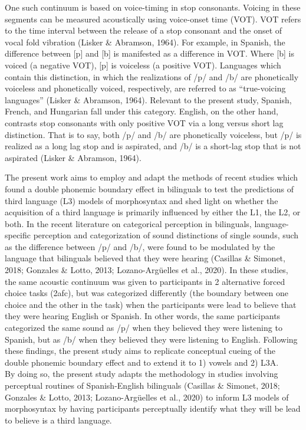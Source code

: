 \documentclass[
  english,
  man]{apa6}
\begin{document}
One such continuum is based on voice-timing in stop consonants.
Voicing in these segments can be measured acoustically using voice-onset time (VOT).
VOT refers to the time interval between the release of a stop consonant and the onset of vocal fold vibration (Lisker \& Abramson, 1964).
For example, in Spanish, the difference between {[}p{]} and {[}b{]} is manifested as a difference in VOT.
Where {[}b{]} is voiced (a negative VOT), {[}p{]} is voiceless (a positive VOT).
Languages which contain this distinction, in which the realizations of /p/ and /b/ are phonetically voiceless and phonetically voiced, respectively, are referred to as ``true-voicing languages'' (Lisker \& Abramson, 1964).
Relevant to the present study, Spanish, French, and Hungarian fall under this category.
English, on the other hand, contrasts stop consonants with only positive VOT via a long versus short lag distinction.
That is to say, both /p/ and /b/ are phonetically voiceless, but /p/ is realized as a long lag stop and is aspirated, and /b/ is a short-lag stop that is not aspirated (Lisker \& Abramson, 1964).

The present work aims to employ and adapt the methods of recent studies which found a double phonemic boundary effect in bilinguals to test the predictions of third language (L3) models of morphosyntax and shed light on whether the acquisition of a third language is primarily influenced by either the L1, the L2, or both.
In the recent literature on categorical perception in bilinguals, language-specific perception and categorization of sound distinctions of single sounds, such as the difference between /p/ and /b/, were found to be modulated by the language that bilinguals believed that they were hearing (Casillas \& Simonet, 2018; Gonzales \& Lotto, 2013; Lozano-Argüelles et al., 2020).
In these studies, the same acoustic continuum was given to participants in 2 alternative forced choice tasks (2afc), but was categorized differently (the boundary between one choice and the other in the task) when the participants were lead to believe that they were hearing English or Spanish.
In other words, the same participants categorized the same sound as /p/ when they believed they were listening to Spanish, but as /b/ when they believed they were listening to English.
Following these findings, the present study aims to replicate conceptual cueing of the double phonemic boundary effect and to extend it to 1) vowels and 2) L3A. \\
By doing so, the present study adapts the methodology in studies involving perceptual routines of Spanish-English bilinguals (Casillas \& Simonet, 2018; Gonzales \& Lotto, 2013; Lozano-Argüelles et al., 2020) to inform L3 models of morphosyntax by having participants perceptually identify what they will be lead to believe is a third language.
\end{document}
